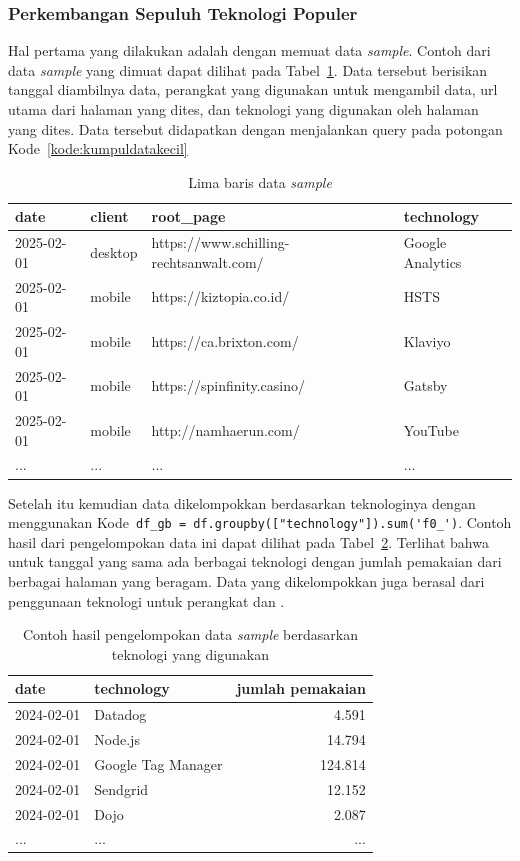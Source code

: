 \subsubsection{Perkembangan Sepuluh Teknologi Populer}
\label{subsub: 10semua}
Hal pertama yang dilakukan adalah dengan memuat data \textit{sample}. Contoh dari data \textit{sample} yang dimuat dapat dilihat pada Tabel~\ref{tab:sample}. Data tersebut berisikan tanggal diambilnya data, perangkat yang digunakan untuk mengambil data, url utama dari halaman \web yang dites, dan teknologi yang digunakan oleh halaman \web yang dites. Data tersebut didapatkan dengan menjalankan query pada potongan Kode~\ref{kode:kumpuldatakecil} 
\begin{table}[H]
    \centering
    \caption{Lima baris data \textit{sample}}
    \label{tab:sample}
    \begin{tabular}{|l|l|l|l|}
        \hline
        date & client & root\_page & technology \\ \hline
        2025-02-01 & desktop & https://www.schilling-rechtsanwalt.com/ & Google Analytics \\ \hline
        2025-02-01 & mobile & https://kiztopia.co.id/ & HSTS \\ \hline
        2025-02-01 & mobile & https://ca.brixton.com/ & Klaviyo \\ \hline
        2025-02-01 & mobile & https://spinfinity.casino/ & Gatsby \\ \hline
        2025-02-01 & mobile & http://namhaerun.com/ & YouTube \\ \hline
        ...&...&...&... \\ \hline
    \end{tabular}
\end{table}

Setelah itu kemudian data dikelompokkan berdasarkan teknologinya dengan menggunakan Kode~\verb|df_gb = df.groupby(["technology"]).sum('f0_')|. Contoh hasil dari pengelompokan data ini dapat dilihat pada Tabel~\ref{tab:gbsample}. Terlihat bahwa untuk tanggal yang sama ada berbagai teknologi dengan jumlah pemakaian dari berbagai halaman \web yang beragam. Data yang dikelompokkan juga berasal dari penggunaan teknologi untuk perangkat \mobile dan \desktop.
\begin{table}[H]
    \centering
    \caption{Contoh hasil pengelompokan data \textit{sample} berdasarkan teknologi yang digunakan}
    \label{tab:gbsample}
    \begin{tabular}{|l|l|r|}
        \hline
        date & technology & jumlah pemakaian \\ \hline
        2024-02-01 & Datadog & 4.591 \\ \hline
        2024-02-01 & Node.js & 14.794 \\ \hline
        2024-02-01 & Google Tag Manager & 124.814 \\ \hline
        2024-02-01 & Sendgrid & 12.152 \\ \hline
        2024-02-01 & Dojo & 2.087 \\ \hline
        ...&...&... \\ \hline
    \end{tabular}
\end{table}

